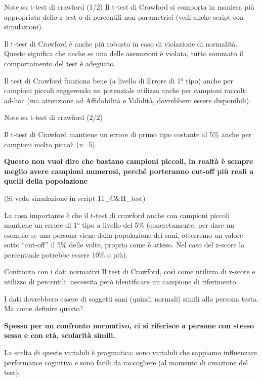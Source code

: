 \documentclass[
  ignorenonframetext,
  aspectratio=169,
]{beamer}
\begin{document}
\begin{frame}{Note su t-test di crawford (1/2)}
\label{note-su-t-test-di-crawford-12}
Il t-test di Crawford si comporta in maniera più appropriata dello
z-test o di percentili non parametrici (vedi anche script con
simulazioni).

Il t-test di Crawford è anche più robusto in caso di violazione di
normalità. Questo significa che anche se una delle assunzioni è violata,
tutto sommato il comportamento del test è adeguato.

Il test di Crawford funziona bene (a livello di Errore di 1° tipo) anche
per campioni piccoli suggerendo un potenziale utilizzo anche per
campioni raccolti ad-hoc (ma attenzione ad Affidabilità e Validità,
dovrebbero essere disponibili).
\end{frame}

\begin{frame}{Note su t-test di crawford (2/2)}
\label{note-su-t-test-di-crawford-22}
\small

Il t-test di Crawford mantiene un errore di primo tipo costante al 5\%
anche per campioni molto piccoli (n=5).

\textbf{Questo non vuol dire che bastano campioni piccoli, in realtà è
sempre meglio avere campioni numerosi, perché porteranno cut-off più
reali a quelli della popolazione}

(Si veda simulazione in script 11\_C\&H\_test)

La cosa importante è che il t-test di crawford anche con campioni
piccoli mantiene un errore di 1° tipo a livello del 5\% (concretamente,
per dare un esempio se una persona viene dalla popolazione dei sani,
otterremo un valore sotto ``cut-off'' il 5\% delle volte, proprio come è
atteso. Nel caso del z-score la percentuale potrebbe essere 10\% o più).
\end{frame}

\begin{frame}{Confronto con i dati normativi}
\label{confronto-con-i-dati-normativi}
Il test di Crawford, così come utilizzo di z-score e utilizzo di
percentili, necessita però identificare un campione di riferimento.

I dati dovrebbero essere di soggetti sani (quindi normali) simili alla
persona testa. Ma come definire questo?

\textbf{Spesso per un confronto normativo, ci si riferisce a persone con
stesso sesso e con età, scolarità simili.}

La scelta di queste variabili è pragmatica: sono variabili che sappiamo
influenzare performance cognitiva e sono facili da raccogliere (al
momento di creazione del test).
\end{frame}
\end{document}
